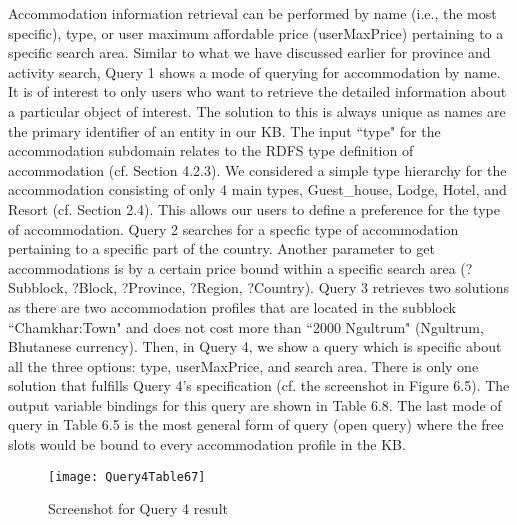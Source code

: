 \hspace{0.3in} Accommodation information retrieval can be performed by name (i.e., the most specific), type, or user maximum affordable price (userMaxPrice) pertaining to a specific search area. Similar to what we have discussed earlier for province and activity search, Query 1 shows a mode of querying for accommodation by name. It is of interest to only users who want to retrieve the detailed information about a particular object of interest. The solution to this is always unique as names are the primary identifier of an entity in our KB. The input ``type" for the accommodation subdomain relates to the RDFS type definition of accommodation (cf. Section 4.2.3). We considered a simple type hierarchy for the accommodation consisting of only 4 main types, Guest\_house, Lodge, Hotel, and Resort (cf. Section 2.4). This allows our users to define a preference for the type of accommodation. Query 2 searches for a specfic type of accommodation pertaining to a specific part of the country. Another parameter to get accommodations is by a certain price bound within a specific search area (?Subblock, ?Block, ?Province, ?Region, ?Country). Query 3 retrieves two solutions as there are two accommodation profiles that are located in the subblock ``Chamkhar:Town" and does not cost more than ``2000 Ngultrum" (Ngultrum, Bhutanese currency). Then, in Query 4, we show a query which is specific about all the three options: type, userMaxPrice, and search area. There is only one solution that fulfills Query 4's specification (cf. the screenshot in Figure 6.5). The output variable bindings for this query are shown in Table 6.8. The last mode of query in Table 6.5 is the most general form of query (open query) where the free slots would be bound to every accommodation profile in the KB.\\


\begin{figure}
\begin{center}
\texttt{[image: Query4Table67]}
\caption {Screenshot for Query 4 result}
\label{fig:Fig6.2}
\end{center}
\end{figure}


